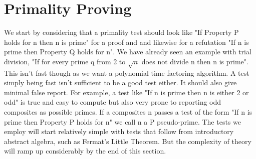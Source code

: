 \documentclass{article}
\begin{document}

 
 
\section{Primality Proving}
We start by considering that a primality test should look like "If Property P holds for n then n is prime"  for a proof and and likewise for a  refutation "If n is prime then Property Q holds for n".  We have already seen an example with trial division, "If for every prime q from 2 to $\sqrt{n}$ does not divide n  then n is prime". This isn't fast though as we want a polynomial time factoring algorithm. A test simply being fast isn't sufficient to be a good test either. It should also give minimal false report. For example, a test like "If n is prime then n is either 2 or odd" is true and easy to compute but also very prone to reporting odd composites as possible primes.  If a composites n passes a test of the form "If n is prime then Property P holds for n" we call n a P pseudo-prime. The tests we employ will start relatively simple with tests that follow from introductory abstract algebra, such as Fermat's Little Theorem. But the complexity of theory will ramp up considerably by the end of this section. 
\end{document}
